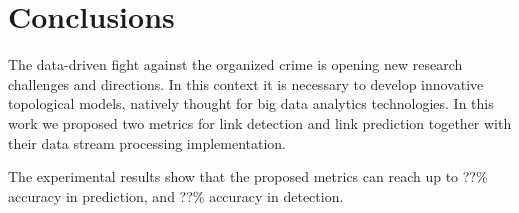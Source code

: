 \section{Conclusions}
\label{sec:conclusions}

The data-driven fight against the organized crime is opening new research challenges and directions. 
In this context it is necessary to develop innovative topological models, natively thought for big data analytics technologies.
In this work we proposed two metrics for link detection and link prediction together with their data stream processing implementation. 

The experimental results show that the proposed metrics can reach up to ??\% accuracy in prediction, and ??\% accuracy in detection.
